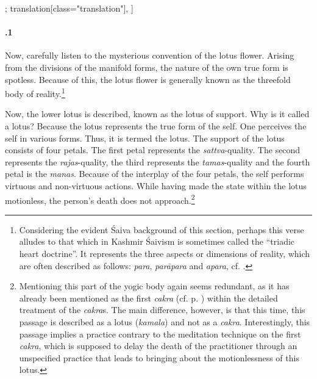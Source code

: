 \begin{alignment}[
  texts=edition[class="edition"];
  translation[class="translation"],
  ]
\begin{translation}
\begin{tlate}[45_1]
     \paragraph{.1} Now, carefully listen to the mysterious convention of the lotus flower. Arising from the divisions of the manifold forms, the nature of the own true form is spotless. Because of this, the lotus flower is generally known as the threefold body of reality.\footnote{Considering the evident Śaiva background of this section, perhaps this verse alludes to that which in Kashmir Śaivism is sometimes called the ``triadic heart doctrine''. It represents the three aspects or dimensions of reality, which are often described as follows: \textit{para}, \textit{parāpara} and \textit{apara}, cf. \citeauthor[1989]{triadicheart}.}   
     \end{tlate}
      \begin{tlate}[p46_01]
      Now, the lower lotus is described, known as the lotus of support. Why is it called a lotus? Because the lotus represents the true form of the self. One perceives the self in various forms. Thus, it is termed the
      lotus. The support of the lotus consists of four petals. The first petal represents the \textit{sattva}-quality. The second represents the \textit{rajas}-quality, the third represents the \textit{tamas}-quality and the fourth petal is the \textit{manas}. Because of the interplay of the four petals, the self performs virtuous and non-virtuous actions. While having made the state within the lotus motionless, the person's death does not approach.\footnote{Mentioning this part of the yogic body again seems redundant, as it has already been mentioned as the first \textit{cakra} (cf. p. \pageref{cakra1}) within the detailed treatment of the \textit{cakra}s. The main difference, however, is that this time, this passage is described as a lotus (\textit{kamala}) and not as a \textit{cakra}. Interestingly, this passage implies a practice contrary to the meditation technique on the first \textit{cakra}, which is supposed to delay the death of the practitioner through an unspecified practice that leads to bringing about the motionlessness of this lotus.}
      \flushpage
    \end{tlate}
  \end{translation}
\end{alignment}
